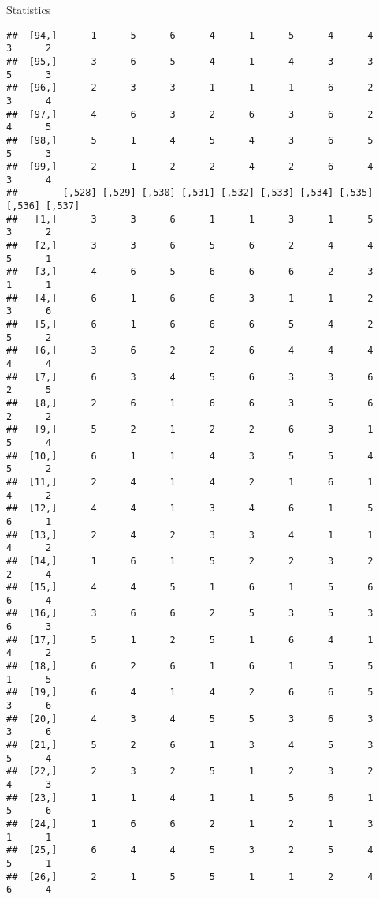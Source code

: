 \documentclass[
  ignorenonframetext,
]{beamer}
\begin{document}
\begin{frame}[fragile]{Statistics}
\begin{verbatim}
##  [94,]      1      5      6      4      1      5      4      4      3      2
##  [95,]      3      6      5      4      1      4      3      3      5      3
##  [96,]      2      3      3      1      1      1      6      2      3      4
##  [97,]      4      6      3      2      6      3      6      2      4      5
##  [98,]      5      1      4      5      4      3      6      5      5      3
##  [99,]      2      1      2      2      4      2      6      4      3      4
##        [,528] [,529] [,530] [,531] [,532] [,533] [,534] [,535] [,536] [,537]
##   [1,]      3      3      6      1      1      3      1      5      3      2
##   [2,]      3      3      6      5      6      2      4      4      5      1
##   [3,]      4      6      5      6      6      6      2      3      1      1
##   [4,]      6      1      6      6      3      1      1      2      3      6
##   [5,]      6      1      6      6      6      5      4      2      5      2
##   [6,]      3      6      2      2      6      4      4      4      4      4
##   [7,]      6      3      4      5      6      3      3      6      2      5
##   [8,]      2      6      1      6      6      3      5      6      2      2
##   [9,]      5      2      1      2      2      6      3      1      5      4
##  [10,]      6      1      1      4      3      5      5      4      5      2
##  [11,]      2      4      1      4      2      1      6      1      4      2
##  [12,]      4      4      1      3      4      6      1      5      6      1
##  [13,]      2      4      2      3      3      4      1      1      4      2
##  [14,]      1      6      1      5      2      2      3      2      2      4
##  [15,]      4      4      5      1      6      1      5      6      6      4
##  [16,]      3      6      6      2      5      3      5      3      6      3
##  [17,]      5      1      2      5      1      6      4      1      4      2
##  [18,]      6      2      6      1      6      1      5      5      1      5
##  [19,]      6      4      1      4      2      6      6      5      3      6
##  [20,]      4      3      4      5      5      3      6      3      3      6
##  [21,]      5      2      6      1      3      4      5      3      5      4
##  [22,]      2      3      2      5      1      2      3      2      4      3
##  [23,]      1      1      4      1      1      5      6      1      5      6
##  [24,]      1      6      6      2      1      2      1      3      1      1
##  [25,]      6      4      4      5      3      2      5      4      5      1
##  [26,]      2      1      5      5      1      1      2      4      6      4

\end{verbatim}
\end{frame}
\end{document}
